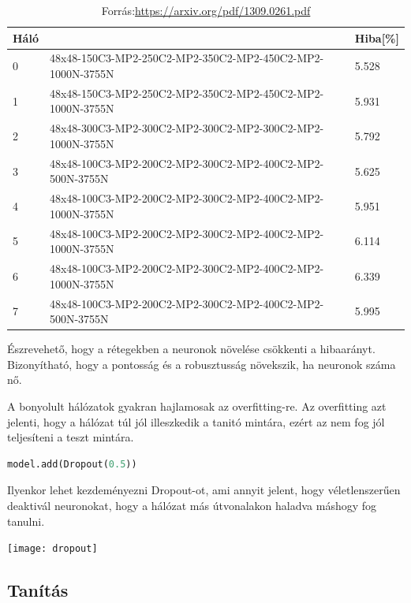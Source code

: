 \begin{table}[h]
\centering
\caption{Forrás:\url{https://arxiv.org/pdf/1309.0261.pdf}}
\begin{tabular}{|l|l|l|}
\hline
 Háló &                                                                      & Hiba[\%] \\ \hline
0               & 48x48-150C3-MP2-250C2-MP2-350C2-MP2-450C2-MP2-1000N-3755N & 5.528 \\ \hline
1               & 48x48-150C3-MP2-250C2-MP2-350C2-MP2-450C2-MP2-1000N-3755N & 5.931 \\ \hline
2               & 48x48-300C3-MP2-300C2-MP2-300C2-MP2-300C2-MP2-1000N-3755N & 5.792 \\ \hline
3               & 48x48-100C3-MP2-200C2-MP2-300C2-MP2-400C2-MP2-500N-3755N  & 5.625 \\ \hline
4               & 48x48-100C3-MP2-200C2-MP2-300C2-MP2-400C2-MP2-1000N-3755N & 5.951 \\ \hline
5               & 48x48-100C3-MP2-200C2-MP2-300C2-MP2-400C2-MP2-1000N-3755N & 6.114 \\ \hline
6               & 48x48-100C3-MP2-200C2-MP2-300C2-MP2-400C2-MP2-1000N-3755N & 6.339 \\ \hline
7               & 48x48-100C3-MP2-200C2-MP2-300C2-MP2-400C2-MP2-500N-3755N  & 5.995 \\ \hline
\end{tabular}
\end{table}

Észrevehető, hogy a rétegekben a neuronok növelése csökkenti a hibaarányt. Bizonyítható, hogy a pontosság és a robusztusság növekszik, ha neuronok száma nő.

A bonyolult hálózatok gyakran hajlamosak az overfitting-re. Az overfitting azt jelenti, hogy a hálózat túl jól illeszkedik a tanitó mintára, ezért az nem fog jól teljesíteni a teszt mintára.

\begin{lstlisting}[language=Python]
model.add(Dropout(0.5))
\end{lstlisting}

Ilyenkor lehet kezdeményezni Dropout-ot, ami annyit jelent, hogy véletlenszerűen deaktivál neuronokat, hogy a hálózat más útvonalakon haladva máshogy fog tanulni.

\begin{center}
\texttt{[image: dropout]}
\end{center} 

\subsection{Tanítás}

